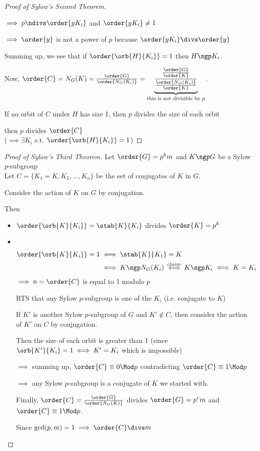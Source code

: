 \begin{proof}[Proof of Sylow's Second Theorem]
\begin{subproof}
        \(\implies p\ndivs \order{yK_i}\) and \(\order{yK_i}\neq 1\)

        \(\implies \order{y}\) is not a power of \(p\) because \(\order{yK_i}\divs \order{y}\)
    \end{subproof}
    Summing up, we see that if \(\order{\orb{H}{K_i}}=1\) then \(H\sgp K_i\).

    Now, \(\order{C}=\index{G}{N_G(K)} = \frac{\order{G}}{\order{N_G(K_i)}} = \underbrace{\frac{\frac{\order{G}}{\order{K}}}{\frac{\order{N_G(K_i)}}{\order{K}}}}_{\text{this is not divisible by } p}\).

    If no orbit of \(C\) under \(H\) has size 1, then \(p\) divides the size of each orbit

    then \(p\) divides \(\order{C}\) \contradiction\\
    (\(\implies \exists K_i \) s.t. \(\order{\orb{H}{K_i}} = 1\))
\end{proof}

\begin{proof}[Proof of Sylow's Third Theorem]
    Let \(\order{G}=p^km\) and \(K \sgp G\) be a Sylow \(p\)-subgroup \\
    Let \(C = \{K_1=K, K_2, \ldots, K_n\}\) be the set of conjugates of \(K\) in \(G\).

    Consider the action of \(K\) on \(G\) by conjugation.

    Then \begin{itemize}
        \item \(\order{\orb{K}{K_i}}=\index{K}{\stab{K}{K_i}}\) divides \(\order{K}=p^k\)
        \item \ \vspace{-2em} \begin{align*}
            \order{\orb{K}{K_i}} = 1 &\iff \stab{K}{K_1} = K \\
            &\iff K\sgp N_G(K_i) \overset{claim}{\iff} K\sgp K_i \iff K = K_i
        \end{align*}
        \(\implies n = \order{C}\) is equal to 1 modulo \(p\)

        RTS that any Sylow \(p\)-subgroup is one of the \(K_i\) (i.e. conjugate to \(K\))

        If \(K'\) is another Sylow \(p\)-subgroup of \(G\) and \(K'\not\in C\), then consider the action of \(K'\) on \(C\) by conjugation.

        Then the size of each orbit is greater than 1 (since \(\orb{K'}{K_i}=1 \iff K'=K_i\) which is impossible)

        \(\implies\) summing up, \(\order{C}\equiv 0\Mod p\) contradicting \(\order{C}\equiv 1\Mod p\)

        \(\implies\) any Sylow \(p\)-subgroup is a conjugate of \(K\) we started with.

        Finally, \(\order{C} = \frac{\order{G}}{\order{N_G(K)}}\) divides \(\order{G}=p^rm\) and \(\order{C}\equiv 1 \Mod p\).

        Since \(\gcd(p,m)=1\implies \order{C}\divs m\)
    \end{itemize}
\end{proof}
